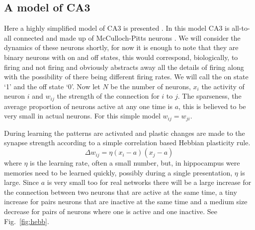 \documentclass[11pt,a4paper]{scrartcl}
\begin{document}
\subsection*{A model of CA3}
Here a highly simplified model of CA3 is presented
\cite{Amit1992a}. In this model CA3 is all-to-all connected and made
up of McCulloch-Pitts neurons \cite{McCullochPitts1943a}. We will
consider the dynamics of these neurons shortly, for now it is enough
to note that they are binary neurons with on and off states, this
would correspond, biologically, to firing and not firing and obviously
abstracts away all the details of firing along with the possibility of
there being different firing rates. We will call the on state
\lq{}1\rq{} and the off state \lq{}0\rq{}. Now let $N$ be the number
of neurons, $x_i$ the activity of neuron $i$ and $w_{ij}$ the strength
of the connection for $i$ to $j$. The sparseness, the average
proportion of neurons active at any one time is $a$, this is believed
to be very small in actual neurons. For this simple model $w_{ij}=w_{ji}$.

During learning the patterns are activated and plastic changes are
made to the synapse strength according to a simple correlation based Hebbian plasticity rule.
\begin{equation}
\Delta w_{ij}=\eta (x_i-a)(x_j-a)
\end{equation}
where $\eta$ is the learning rate, often a small number, but, in
hippocampus were memories need to be learned quickly, possibly during
a single presentation, $\eta$ is large. Since $a$ is very small too
for real networks there will be a large increase for the connection
between two neurons that are active at the same time, a tiny increase
for pairs neurons that are inactive at the same time and a medium size
decrease for pairs of neurons where one is active and one
inactive. See Fig.~\ref{fig:hebb}.
\end{document}
